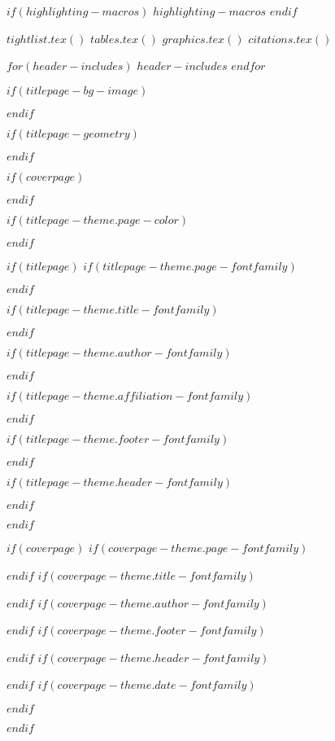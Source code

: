 $if(highlighting-macros)$
$highlighting-macros$
$endif$

$tightlist.tex()$
$tables.tex()$
$graphics.tex()$
$citations.tex()$

$for(header-includes)$
$header-includes$
$endfor$

\usepackage{hyphenat}
\usepackage{ifthen}
\usepackage{calc}
\usepackage{calculator}

$if(titlepage-bg-image)$
\usepackage{graphicx}
\usepackage{wallpaper}
$endif$

$if(titlepage-geometry)$
\usepackage{geometry}
$endif$

$if(coverpage)$
\usepackage{graphicx}
\usepackage{geometry}
\usepackage{afterpage}
\usepackage{tikz}
\usetikzlibrary{calc}
\usetikzlibrary{fadings}
\usepackage[pagecolor=none]{pagecolor}
$endif$

$if(titlepage-theme.page-color)$
\usepackage[pagecolor=none]{pagecolor}
$endif$

$if(titlepage)$
$if(titlepage-theme.page-fontfamily)$
\usepackage{fontspec}
$endif$

$if(titlepage-theme.title-fontfamily)$
\usepackage{fontspec}
$endif$

$if(titlepage-theme.author-fontfamily)$
\usepackage{fontspec}
$endif$

$if(titlepage-theme.affiliation-fontfamily)$
\usepackage{fontspec}
$endif$

$if(titlepage-theme.footer-fontfamily)$
\usepackage{fontspec}
$endif$

$if(titlepage-theme.header-fontfamily)$
\usepackage{fontspec}
$endif$

$endif$

$if(coverpage)$
$if(coverpage-theme.page-fontfamily)$
\usepackage{fontspec}
$endif$
$if(coverpage-theme.title-fontfamily)$
\usepackage{fontspec}
$endif$
$if(coverpage-theme.author-fontfamily)$
\usepackage{fontspec}
$endif$
$if(coverpage-theme.footer-fontfamily)$
\usepackage{fontspec}
$endif$
$if(coverpage-theme.header-fontfamily)$
\usepackage{fontspec}
$endif$
$if(coverpage-theme.date-fontfamily)$
\usepackage{fontspec}
$endif$

$endif$

